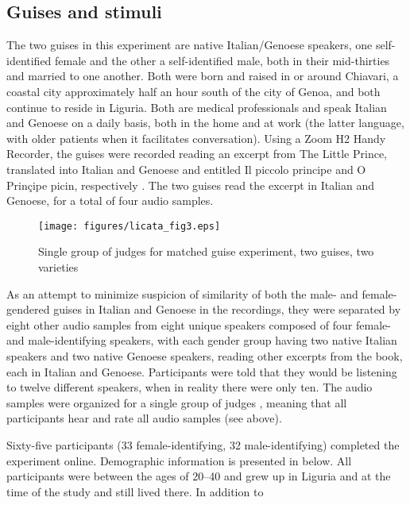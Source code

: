 \documentclass[output=paper,colorlinks,citecolor=brown]{langscibook}
\begin{document}
\subsection{Guises and stimuli}
The two guises in this experiment are native Italian/Genoese speakers, one self-identified female and the other a self-identified male, both in their mid-thirties and married to one another. Both were born and raised in or around Chiavari, a coastal city approximately half an hour south of the city of Genoa, and both continue to reside in Liguria. Both are medical professionals and speak Italian and Genoese on a daily basis, both in the home and at work (the latter language, with older patients when it facilitates conversation). Using a Zoom H2 Handy Recorder, the guises were recorded reading an excerpt from The Little Prince, translated into Italian and Genoese and entitled Il piccolo principe and O Prinçipe picin, respectively \citep{desa15}. The two guises read the excerpt in Italian and Genoese, for a total of four audio samples.

\begin{figure}
    \texttt{[image: figures/licata\_fig3.eps]}
    \caption{Single group of judges for matched guise experiment, two guises, two varieties \citep{stef05}}
    \label{fig:licata:03}
\end{figure}

As an attempt to minimize suspicion of similarity of both the male- and female-gendered guises in Italian and Genoese in the recordings, they were separated by eight other audio samples from eight unique speakers composed of four female- and male-identifying speakers, with each gender group having two native Italian speakers and two native Genoese speakers, reading other excerpts from the book, each in Italian and Genoese. Participants were told that they would be listening to twelve different speakers, when in reality there were only ten. The audio samples were organized for a single group of judges \citep{stef05}, meaning that all participants hear and rate all audio samples (see  above).

\par Sixty-five participants (33 female-identifying, 32 male-identifying) completed the experiment online. Demographic information is presented in  below. All participants were between the ages of 20–40 and grew up in Liguria and at the time of the study and still lived there. In addition to 
\end{document}

